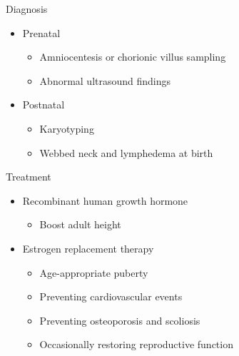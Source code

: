 \documentclass{beamer}
\begin{document}
\begin{frame}{Diagnosis}
    \begin{itemize}
        \item Prenatal
            \begin{itemize}
                \item Amniocentesis or chorionic villus sampling
                \item Abnormal ultrasound findings
            \end{itemize}
        \item Postnatal
            \begin{itemize}
                \item Karyotyping
                \item Webbed neck and lymphedema at birth
            \end{itemize}
    \end{itemize}
\end{frame}

\begin{frame}{Treatment}
    \begin{itemize}
        \item Recombinant human growth hormone
            \begin{itemize}
                \item Boost adult height
            \end{itemize}
        \item Estrogen replacement therapy
            \begin{itemize}
                \item Age-appropriate puberty
                \item Preventing cardiovascular events
                \item Preventing osteoporosis and scoliosis
                \item Occasionally restoring reproductive function
            \end{itemize}
    \end{itemize}
\end{frame}
\end{document}
